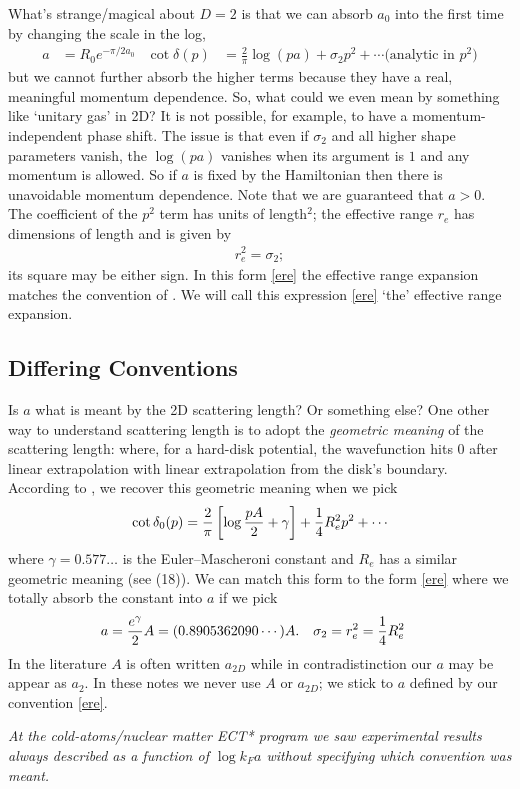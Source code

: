 What's strange/magical about $D=2$ is that we can absorb $a_0$ into the first time by changing the scale in the log,
\begin{align}
	a &= R_0 e^{-\pi/2a_0}
	&
	\cot \delta(p)
	&=
			\frac{2}{\pi} \log(p a)
		+	\sigma_2 p^2
		+	\cdots \text{(analytic in }p^2)
	\label{eq:ere}
\end{align}
but we cannot further absorb the higher terms because they have a real, meaningful momentum dependence.
So, what could we even mean by something like `unitary gas' in 2D?
It is not possible, for example, to have a momentum-independent phase shift.
The issue is that even if $\sigma_2$ and all higher shape parameters vanish, the $\log(pa)$ vanishes when its argument is $1$ and any momentum is allowed.
So if $a$ is fixed by the Hamiltonian then there is unavoidable momentum dependence.
Note that we are guaranteed that $a>0$.
The coefficient of the $p^2$ term has units of length${}^2$; the effective range $r_e$ has dimensions of length and is given by
\begin{align}
	r_e^2 = \sigma_2;
\end{align}
its square may be either sign.
In this form \eqref{ere} the effective range expansion matches the convention of .
We will call this expression \eqref{ere} `the' effective range expansion.

\subsection{Differing Conventions}

Is $a$ what is meant by the 2D scattering length?  Or something else?
One other way to understand scattering length is to adopt the \emph{geometric meaning} of the scattering length: where, for a hard-disk potential, the wavefunction hits 0 after linear extrapolation  with linear extrapolation from the disk's boundary.
According to , we recover this geometric meaning when we pick
\begin{align}
	\cot \delta_0(p) = \frac{2}{\pi}\left[\log \frac{pA}{2} + \gamma\right] + \frac{1}{4} R_e^2 p^2 + \cdots
	\label{eq:ere in the hard-disk convention}
\end{align}
where $\gamma = 0.577\ldots$ is the Euler–Mascheroni constant and $R_e$ has a similar geometric meaning (see  (18)).
We can match this form to the form \eqref{ere} where we totally absorb the constant into $a$ if we pick
\begin{align}
	a &= \frac{e^{\gamma}}{2} A = (0.8905362090\cdots) A.
	&
	\sigma_2 = r_e^2 &= \frac{1}{4} R_e^2
\end{align}
In the literature $A$ is often written $a_{2D}$ while in contradistinction our $a$ may be appear as $a_2$.
In these notes we never use $A$ or $a_{2D}$; we stick to $a$ defined by our convention \eqref{ere}.

\emph{At the cold-atoms/nuclear matter ECT* program we saw experimental results always described as a function of $\log k_F a$ without specifying which convention was meant.}
